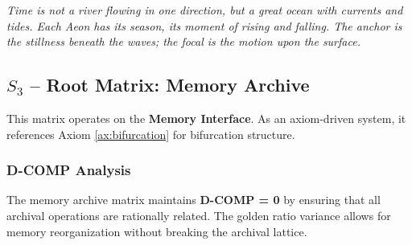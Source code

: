 \textit{Time is not a river flowing in one direction, but a great ocean with currents and tides. Each Aeon has its season, its moment of rising and falling. The anchor is the stillness beneath the waves; the focal is the motion upon the surface.}

\subsection{$S_{3}$ -- Root Matrix: Memory Archive}\label{sec:19.0.3}

This matrix operates on the \textbf{Memory Interface}. As an axiom-driven system, it references Axiom \ref{ax:bifurcation} for bifurcation structure.

\subsubsection{D-COMP Analysis}

The memory archive matrix maintains \textbf{D-COMP = 0} by ensuring that all archival operations are rationally related. The golden ratio variance allows for memory reorganization without breaking the archival lattice.

